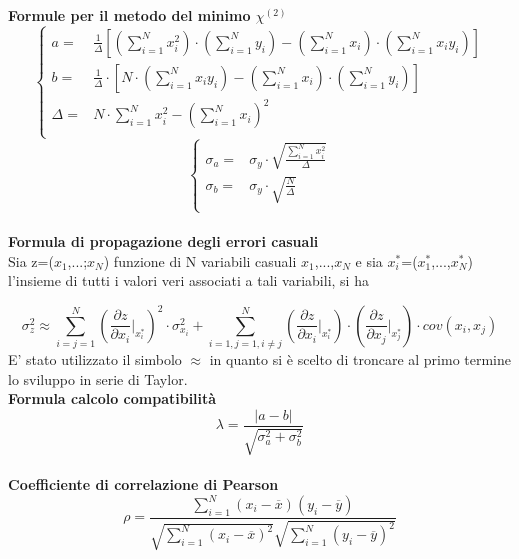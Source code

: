 \documentclass[a4paper,11pt,oneside]{article}
\begin{document}
\textbf{Formule per il metodo del minimo ${\chi}^{(2)}$}
\begin{equation*}
        \begin{cases}
    a=&\frac{1}{\Delta}[(\sum\limits_{i=1}^{N}{x_{i}^{2}})\cdot(\sum\limits_{i=1}^{N}{y_{i}})-(\sum\limits_{i=1}^{N}{x_{i}})\cdot(\sum\limits_{i=1}^{N}{x_{i}y_{i}})] \\ 
    b=&\frac{1}{\Delta }\cdot \left [N\cdot \left ( \sum\limits_{i=1}^{N}x_i y_i \right )-\left ( \sum\limits_{i=1}^{N}x_i \right )\cdot \left ( \sum\limits_{i=1}^{N}y_i \right )  \right ]\\
    \Delta=& N\cdot \sum\limits_{i=1}^{N} x_i^{2} - \left ( \sum\limits_{i=1}^{N}x_i \right )^{2}\\
    \end{cases}
\end{equation*}
\begin{equation*}
    \begin{cases}
    \sigma_{a}=&\sigma_{y}\cdot\sqrt{\frac{\sum_{i=1}^{N}{x_{i}^{2}}}{\Delta}} \\
    \sigma_{b}=&\sigma_y\cdot \sqrt{\frac{N}{\Delta }}\\
    \end{cases}
    \label{equation:err_chi_quadro}
\end{equation*}
\\
\newline
\textbf{Formula di propagazione degli errori casuali}\\

Sia z=($x_1$,...;$x_N$) funzione di N variabili casuali $x_1$,...,$x_N$ e sia ${x_i^\ast}$=($x_1^\ast$,...,$x_N^{\ast}$) l'insieme di tutti i valori veri associati a tali variabili, si ha 

\begin{equation*}
    \sigma_z^{2}\approx  \sum_{i=j=1}^{N}\left ( \frac{\partial z}{\partial x_i}\Big|_{x_i^{\ast}} \right )^{2}\cdot\sigma_{x_i}^{2} +\sum_{i=1,j=1,i\neq j}^{N}\left (\frac{\partial z }{\partial x_i}\Big|_{x_i^{\ast}} \right ) \cdot \left ( \frac{\partial z}{\partial x_j} \Big|_{x_j^{\ast}} \right )\cdot cov(x_i,x_j)\label{eq:prop_errori}
\end{equation*}
E' stato utilizzato il simbolo $\approx$ in quanto si è scelto di troncare al primo termine lo sviluppo in serie di Taylor.\\


\textbf{Formula calcolo compatibilità}\\
\begin{equation*}
    \lambda=\frac{\left|a-b\right|}{\sqrt{\sigma^{2}_{a}+\sigma^{2}_{b}}}
\end{equation*}\\
\textbf{Coefficiente di correlazione di Pearson}\\
\begin{equation*}
    \rho=  \frac{\sum_{i=1}^{N}(x_i - \overline{x}
    )(y_i - \overline{y})}{\sqrt{\sum_{i=1}^{N}(x_i -\overline{x})^2}\sqrt{\sum_{i=1}^{N}(y_i - \overline{y})^2}}
\end{equation*}\textbf{
}
\end{document}
